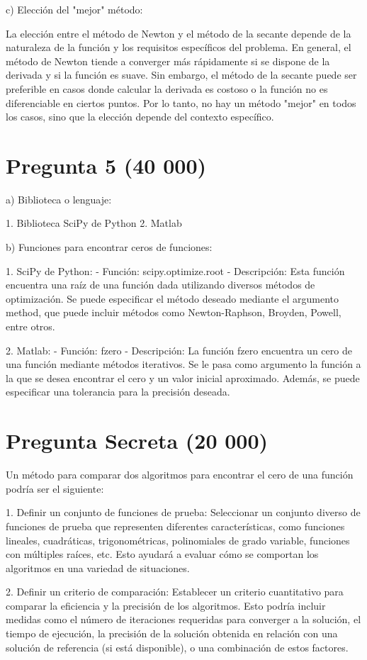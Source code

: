 \documentclass[a4paper,12pt]{article}
\begin{document}
c) Elección del "mejor" método:

La elección entre el método de Newton y el método de la secante depende de la naturaleza de la función y los requisitos específicos del problema. En general, el método de Newton tiende a converger más rápidamente si se dispone de la derivada y si la función es suave. Sin embargo, el método de la secante puede ser preferible en casos donde calcular la derivada es costoso o la función no es diferenciable en ciertos puntos. Por lo tanto, no hay un método "mejor" en todos los casos, sino que la elección depende del contexto específico.


\section*{Pregunta 5 (40 000)}
a) Biblioteca o lenguaje:

1. Biblioteca SciPy de Python
2. Matlab

b) Funciones para encontrar ceros de funciones:

1. SciPy de Python:
   - Función: scipy.optimize.root
   - Descripción: Esta función encuentra una raíz de una función dada utilizando diversos métodos de optimización. Se puede especificar el método deseado mediante el argumento method, que puede incluir métodos como Newton-Raphson, Broyden, Powell, entre otros.

2. Matlab:
   - Función: fzero
   - Descripción: La función fzero encuentra un cero de una función mediante métodos iterativos. Se le pasa como argumento la función a la que se desea encontrar el cero y un valor inicial aproximado. Además, se puede especificar una tolerancia para la precisión deseada.


\section*{Pregunta Secreta (20 000)}
Un método para comparar dos algoritmos para encontrar el cero de una función podría ser el siguiente:

1. Definir un conjunto de funciones de prueba: Seleccionar un conjunto diverso de funciones de prueba que representen diferentes características, como funciones lineales, cuadráticas, trigonométricas, polinomiales de grado variable, funciones con múltiples raíces, etc. Esto ayudará a evaluar cómo se comportan los algoritmos en una variedad de situaciones.

2. Definir un criterio de comparación: Establecer un criterio cuantitativo para comparar la eficiencia y la precisión de los algoritmos. Esto podría incluir medidas como el número de iteraciones requeridas para converger a la solución, el tiempo de ejecución, la precisión de la solución obtenida en relación con una solución de referencia (si está disponible), o una combinación de estos factores.
\end{document}
